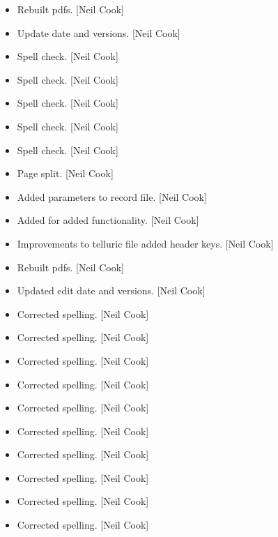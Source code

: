\documentclass[a4paper,10pt,english]{report}
\begin{document}
\begin{itemize}
\item {} 
Rebuilt pdfs. {[}Neil Cook{]}

\item {} 
Update date and versions. {[}Neil Cook{]}

\item {} 
Spell check. {[}Neil Cook{]}

\item {} 
Spell check. {[}Neil Cook{]}

\item {} 
Spell check. {[}Neil Cook{]}

\item {} 
Spell check. {[}Neil Cook{]}

\item {} 
Spell check. {[}Neil Cook{]}

\item {} 
Page split. {[}Neil Cook{]}

\item {} 
Added parameters to record file. {[}Neil Cook{]}

\item {} 
Added  for added functionality. {[}Neil Cook{]}

\item {} 
Improvements to telluric file \sphinxhyphen{} added header keys. {[}Neil Cook{]}

\item {} 
Rebuilt pdfs. {[}Neil Cook{]}

\item {} 
Updated edit date and versions. {[}Neil Cook{]}

\item {} 
Corrected spelling. {[}Neil Cook{]}

\item {} 
Corrected spelling. {[}Neil Cook{]}

\item {} 
Corrected spelling. {[}Neil Cook{]}

\item {} 
Corrected spelling. {[}Neil Cook{]}

\item {} 
Corrected spelling. {[}Neil Cook{]}

\item {} 
Corrected spelling. {[}Neil Cook{]}

\item {} 
Corrected spelling. {[}Neil Cook{]}

\item {} 
Corrected spelling. {[}Neil Cook{]}

\item {} 
Corrected spelling. {[}Neil Cook{]}

\item {} 
Corrected spelling. {[}Neil Cook{]}

\end{itemize}
\end{document}
